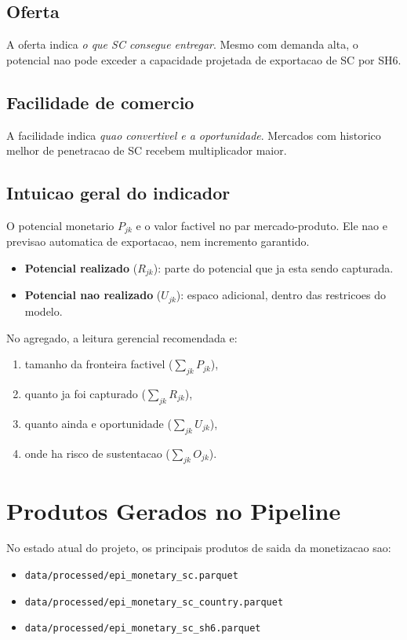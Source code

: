 \documentclass[12pt,a4paper]{article}
\begin{document}
\subsection{Oferta}
A oferta indica \textit{o que SC consegue entregar}. Mesmo com demanda alta, o potencial nao pode exceder a capacidade projetada de exportacao de SC por SH6.

\subsection{Facilidade de comercio}
A facilidade indica \textit{quao convertivel e a oportunidade}. Mercados com historico melhor de penetracao de SC recebem multiplicador maior.

\subsection{Intuicao geral do indicador}
O potencial monetario $P_{jk}$ e o valor factivel no par mercado-produto. Ele nao e previsao automatica de exportacao, nem incremento garantido.

\begin{itemize}
    \item \textbf{Potencial realizado} ($R_{jk}$): parte do potencial que ja esta sendo capturada.
    \item \textbf{Potencial nao realizado} ($U_{jk}$): espaco adicional, dentro das restricoes do modelo.
\end{itemize}

No agregado, a leitura gerencial recomendada e:
\begin{enumerate}
    \item tamanho da fronteira factivel ($\sum_{jk}P_{jk}$),
    \item quanto ja foi capturado ($\sum_{jk}R_{jk}$),
    \item quanto ainda e oportunidade ($\sum_{jk}U_{jk}$),
    \item onde ha risco de sustentacao ($\sum_{jk}O_{jk}$).
\end{enumerate}

\section{Produtos Gerados no Pipeline}
No estado atual do projeto, os principais produtos de saida da monetizacao sao:
\begin{itemize}
    \item \texttt{data/processed/epi\_monetary\_sc.parquet}
    \item \texttt{data/processed/epi\_monetary\_sc\_country.parquet}
    \item \texttt{data/processed/epi\_monetary\_sc\_sh6.parquet}
\end{itemize}
\end{document}
